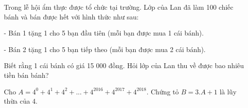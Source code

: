 \begin{ex}
	Trong lễ hội ẩm thực được tổ chức tại trường. Lớp của Lan đã làm 100 chiếc bánh và bán được hết với hình thức như sau:
	
-	Bán 1 tặng 1 cho 5 bạn đầu tiên (mỗi bạn được mua 1 cái bánh).

-	Bán 2 tặng 1 cho 5 bạn tiếp theo (mỗi bạn được mua 2 cái bánh).

Biết rằng 1 cái bánh có giá 15 000 đồng. Hỏi lớp của Lan thu về được bao nhiêu tiền bán bánh?
\end{ex}
\begin{ex}
	Cho $A = {4^0} + {4^1} + {4^2} + ... + {4^{2016}} + {4^{2017}} + {4^{2018}}$.  Chứng tỏ $B = 3.A + 1$ là lũy thừa của 4.
\end{ex}
